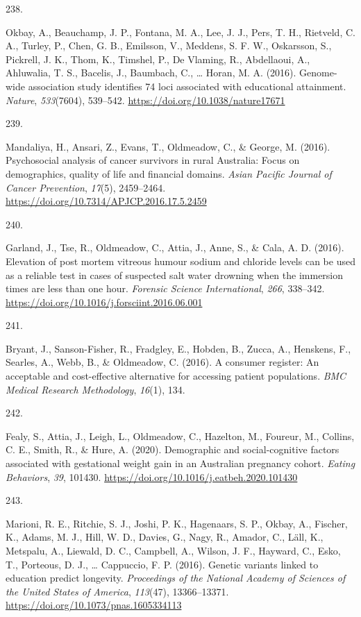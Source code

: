 \documentclass[11pt, a4paper]{awesome-cv}
\newlength{\csllabelwidth}
\newcommand{\CSLLeftMargin}[1]{\parbox[t]{\csllabelwidth}{#1}}
\newcommand{\CSLRightInline}[1]{\parbox[t]{\linewidth - \csllabelwidth}{#1}}
\begin{document}
\leavevmode\hypertarget{ref-okbay_genome-wide_2016}{}%
\CSLLeftMargin{238. }
\CSLRightInline{Okbay, A., Beauchamp, J. P., Fontana, M. A., Lee, J. J.,
Pers, T. H., Rietveld, C. A., Turley, P., Chen, G. B., Emilsson, V.,
Meddens, S. F. W., Oskarsson, S., Pickrell, J. K., Thom, K., Timshel,
P., De Vlaming, R., Abdellaoui, A., Ahluwalia, T. S., Bacelis, J.,
Baumbach, C., \ldots{} Horan, M. A. (2016). Genome-wide association
study identifies 74 loci associated with educational attainment.
\emph{Nature}, \emph{533}(7604), 539--542.
\url{https://doi.org/10.1038/nature17671}}

\leavevmode\hypertarget{ref-mandaliya_psychosocial_2016}{}%
\CSLLeftMargin{239. }
\CSLRightInline{Mandaliya, H., Ansari, Z., Evans, T., Oldmeadow, C., \&
George, M. (2016). Psychosocial analysis of cancer survivors in rural
Australia: Focus on demographics, quality of life and financial domains.
\emph{Asian Pacific Journal of Cancer Prevention}, \emph{17}(5),
2459--2464. \url{https://doi.org/10.7314/APJCP.2016.17.5.2459}}

\leavevmode\hypertarget{ref-garland_elevation_2016}{}%
\CSLLeftMargin{240. }
\CSLRightInline{Garland, J., Tse, R., Oldmeadow, C., Attia, J., Anne,
S., \& Cala, A. D. (2016). Elevation of post mortem vitreous humour
sodium and chloride levels can be used as a reliable test in cases of
suspected salt water drowning when the immersion times are less than one
hour. \emph{Forensic Science International}, \emph{266}, 338--342.
\url{https://doi.org/10.1016/j.forsciint.2016.06.001}}

\leavevmode\hypertarget{ref-bryant_consumer_2016}{}%
\CSLLeftMargin{241. }
\CSLRightInline{Bryant, J., Sanson-Fisher, R., Fradgley, E., Hobden, B.,
Zucca, A., Henskens, F., Searles, A., Webb, B., \& Oldmeadow, C. (2016).
A consumer register: An acceptable and cost-effective alternative for
accessing patient populations. \emph{BMC Medical Research Methodology},
\emph{16}(1), 134.}

\leavevmode\hypertarget{ref-fealy_demographic_2020}{}%
\CSLLeftMargin{242. }
\CSLRightInline{Fealy, S., Attia, J., Leigh, L., Oldmeadow, C.,
Hazelton, M., Foureur, M., Collins, C. E., Smith, R., \& Hure, A.
(2020). Demographic and social-cognitive factors associated with
gestational weight gain in an Australian pregnancy cohort. \emph{Eating
Behaviors}, \emph{39}, 101430.
\url{https://doi.org/10.1016/j.eatbeh.2020.101430}}

\leavevmode\hypertarget{ref-marioni_genetic_2016}{}%
\CSLLeftMargin{243. }
\CSLRightInline{Marioni, R. E., Ritchie, S. J., Joshi, P. K., Hagenaars,
S. P., Okbay, A., Fischer, K., Adams, M. J., Hill, W. D., Davies, G.,
Nagy, R., Amador, C., Läll, K., Metspalu, A., Liewald, D. C., Campbell,
A., Wilson, J. F., Hayward, C., Esko, T., Porteous, D. J., \ldots{}
Cappuccio, F. P. (2016). Genetic variants linked to education predict
longevity. \emph{Proceedings of the National Academy of Sciences of the
United States of America}, \emph{113}(47), 13366--13371.
\url{https://doi.org/10.1073/pnas.1605334113}}
\end{document}
